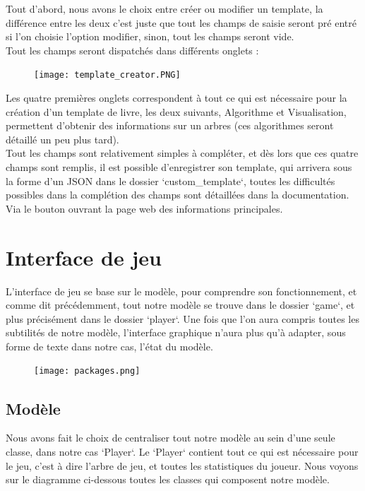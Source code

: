 \documentclass[12pt]{article}
\begin{document}
Tout d'abord, nous avons le choix entre créer ou modifier un template, la différence entre les deux c'est juste que tout les champs de saisie seront pré entré si l'on choisie l'option modifier, sinon, tout les champs seront vide.\\

Tout les champs seront dispatchés dans différents onglets : \\
\begin{figure}[h]
    \centering
    \texttt{[image: template\_creator.PNG]}
\end{figure}

Les quatre premières onglets correspondent à tout ce qui est nécessaire pour la création d'un template de livre, les deux suivants, Algorithme et Visualisation, permettent d'obtenir des informations sur un arbres (ces algorithmes seront détaillé un peu plus tard).\\

Tout les champs sont relativement simples à compléter, et dès lors que ces quatre champs sont remplis, il est possible d'enregistrer son template, qui arrivera sous la forme d'un JSON dans le dossier `custom\_template`, toutes les difficultés possibles dans la complétion des champs sont détaillées dans la documentation. Via le bouton ouvrant la page web des informations principales.

\section{Interface de jeu}
L'interface de jeu se base sur le modèle, pour comprendre son fonctionnement, et comme dit précédemment, tout notre modèle se trouve dans le dossier `game`, et plus précisément dans le dossier `player`. Une fois que l'on aura compris toutes les subtilités de notre modèle, l'interface graphique n'aura plus qu'à adapter, sous forme de texte dans notre cas, l'état du modèle.

\begin{figure}[h]
    \centering
    \texttt{[image: packages.png]}
\end{figure}
\newpage
\subsection{Modèle}
Nous avons fait le choix de centraliser tout notre modèle au sein d'une seule classe, dans notre cas `Player`. Le `Player` contient tout ce qui est nécessaire pour le jeu, c'est à dire l'arbre de jeu, et toutes les statistiques du joueur. Nous voyons sur le diagramme ci-dessous toutes les classes qui composent notre modèle.\\
\end{document}
